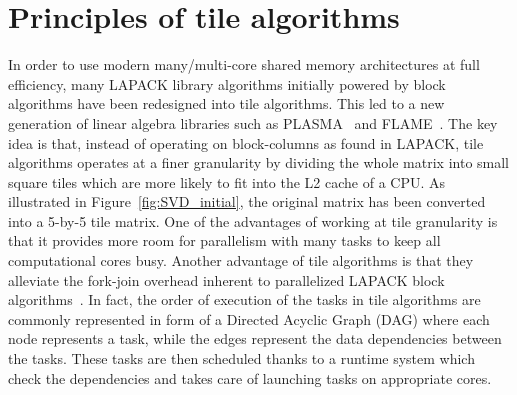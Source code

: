 \section{Principles of tile algorithms}\label{sec:tile}
In order to use modern many/multi-core shared memory architectures at
full efficiency,
many LAPACK library algorithms initially powered by
block algorithms have been redesigned into tile algorithms.
This led to a new generation of linear algebra libraries such as
PLASMA~\cite{DBLP:journals/corr/abs-0709-1272} and FLAME~\cite{FLAWN3}.
The key idea is that,
instead of operating on block-columns as found in LAPACK,
tile algorithms operates at a finer granularity by dividing the whole
matrix into small square tiles which are more likely to fit into the
L2 cache of a CPU.
As illustrated in Figure~\ref{fig:SVD_initial}, the original
matrix has been converted into a 5-by-5 tile matrix.  One of the
advantages of working at tile granularity is that it provides more
room for parallelism with many tasks to keep all computational cores
busy.
Another advantage of tile algorithms is that they alleviate
the fork-join overhead inherent to parallelized LAPACK
block algorithms~\cite{haidar2012analysis}.
In fact,
the order of execution of the tasks in tile algorithms are commonly
represented in form of a Directed Acyclic Graph (DAG) where each node
represents a task, while the edges represent the
data dependencies between the tasks.
These tasks are then scheduled
thanks to a runtime system which check the dependencies and
takes care of launching tasks on appropriate cores.

